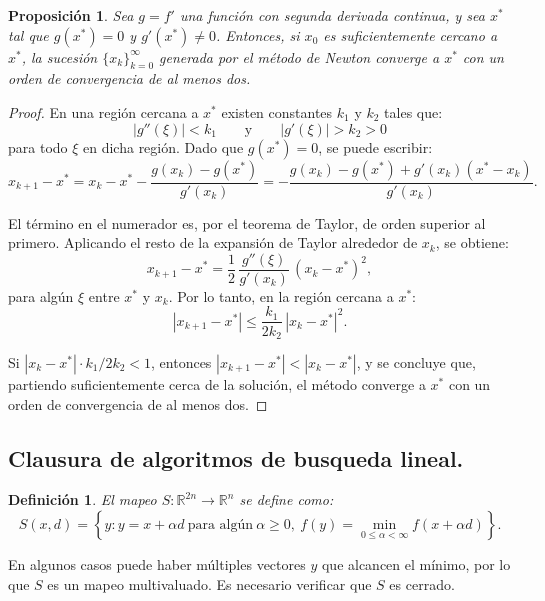 \documentclass[11pt]{article}
\theoremstyle{ejstyle}
\theoremstyle{ejstyle}
\newtheorem{definicion}{Definición}
\theoremstyle{ejstyle}
\theoremstyle{ejstyle}
\theoremstyle{ejstyle}
\newtheorem{prop}{Proposición}
\theoremstyle{ejstyle}
\theoremstyle{ejstyle}
\newcommand{\R}{\mathbb{R}}
\begin{document}
	\begin{prop}
		Sea $g = f'$ una función con segunda derivada continua, y sea $x^*$ tal que $g(x^*) = 0$ y $g'(x^*) \neq 0$. Entonces, si $x_0$ es suficientemente cercano a $x^*$, la sucesión $\{x_k\}_{k=0}^{\infty}$ generada por el método de Newton converge a $x^*$ con un orden de convergencia de al menos dos.
	\end{prop}
	
	\begin{proof}
		En una región cercana a $x^*$ existen constantes $k_1$ y $k_2$ tales que:
		\[
		|g''(\xi)| < k_1 \qquad \text{y} \qquad |g'(\xi)| > k_2 > 0
		\]
		para todo $\xi$ en dicha región. Dado que $g(x^*) = 0$, se puede escribir:
		\[
		x_{k+1} - x^* = x_k - x^* - \frac{g(x_k) - g(x^*)}{g'(x_k)}
		= -\frac{g(x_k) - g(x^*) + g'(x_k)(x^* - x_k)}{g'(x_k)}.
		\]
		
		El término en el numerador es, por el teorema de Taylor, de orden superior al primero. Aplicando el resto de la expansión de Taylor alrededor de $x_k$, se obtiene:
		\[
		x_{k+1} - x^* = \frac{1}{2}\,\frac{g''(\xi)}{g'(x_k)}\,(x_k - x^*)^2,
		\]
		para algún $\xi$ entre $x^*$ y $x_k$. Por lo tanto, en la región cercana a $x^*$:
		\begin{equation}
			|x_{k+1} - x^*| \leq \frac{k_1}{2k_2}\,|x_k - x^*|^2.
			\label{eq:newton_conv}
		\end{equation}
		
		Si $|x_k - x^*|\cdot k_1/2k_2 < 1$, entonces $|x_{k+1} - x^*| < |x_k - x^*|$, y se concluye que, partiendo suficientemente cerca de la solución, el método converge a $x^*$ con un orden de convergencia de al menos dos.
	\end{proof}
	
	\subsection{Clausura de algoritmos de busqueda lineal.}
	
	\begin{definicion}
		El mapeo $S : \R^{2n} \to \R^n$ se define como:
		\begin{equation}
			S(x, d) = \left\{ y : y = x + \alpha d \ \text{para algún} \ \alpha \geq 0, \
			f(y) = \min_{0 \leq \alpha < \infty} f(x + \alpha d) \right\}.
			\label{eq:8.23}
		\end{equation}
	\end{definicion}
	
	En algunos casos puede haber múltiples vectores $y$ que alcancen el mínimo, por lo que $S$ es un mapeo multivaluado. Es necesario verificar que $S$ es cerrado.
	
\end{document}
